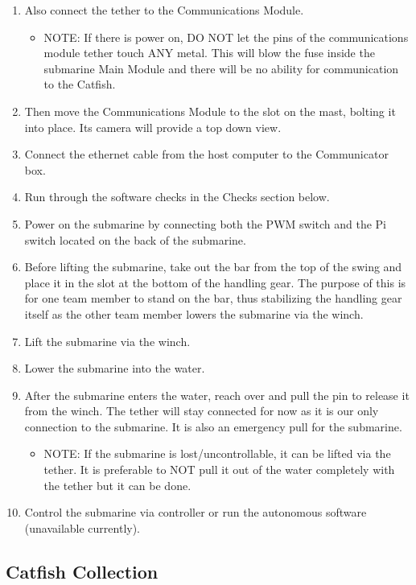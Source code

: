 \documentclass[
18pt, %
a4paper, %
oneside, %
headinclude,footinclude, %
]{scrartcl}
\begin{document}
\begin{enumerate}
	\item Also connect the tether to the Communications Module. 
		\begin{itemize}
				\item NOTE: If there is power on, DO NOT let the pins of the communications module tether touch ANY metal. This will blow the fuse inside the submarine Main Module and there will be no ability for communication to the Catfish.
		\end{itemize}
	\item Then move the Communications Module to the slot on the mast, bolting it into place. Its camera will provide a top down view.
	\item Connect the ethernet cable from the host computer to the Communicator box. 
	\item Run through the software checks in the Checks section below.
	\item Power on the submarine by connecting both the PWM switch and the Pi switch located on the back of the submarine.		
	\item Before lifting the submarine, take out the bar from the top of the swing and place it in the slot at the bottom of the handling gear. The purpose of this is for one team member to stand on the bar, thus stabilizing the handling gear itself as the other team member lowers the submarine via the winch.
	\item Lift the submarine via the winch. 
	\item Lower the submarine into the water.
	\item After the submarine enters the water, reach over and pull the pin to release it from the winch. The tether will stay connected for now as it is our only connection to the submarine. It is also an emergency pull for the submarine.
		\begin{itemize}
				\item NOTE: If the submarine is lost/uncontrollable, it can be lifted via the tether. It is preferable to NOT pull it out of the water completely with the tether but it can be done.	
		\end{itemize}
	\item Control the submarine via controller or run the autonomous software (unavailable currently). 
\end{enumerate}


\subsection{Catfish Collection}
\end{document}
